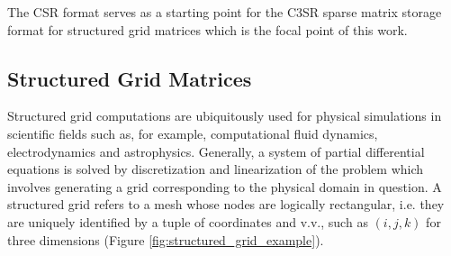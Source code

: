 \documentclass{article}
\begin{document}
    The CSR format serves as a starting point for the C3SR sparse matrix storage format for structured grid matrices which is the focal point of this work.

  \subsection{Structured Grid Matrices}

    Structured grid computations are ubiquitously used for physical simulations in scientific fields such as, for example, computational fluid dynamics, electrodynamics and astrophysics. Generally, a system of partial differential equations is solved by discretization and linearization of the problem which involves generating a grid corresponding to the physical domain in question. A structured grid refers to a mesh whose nodes are logically rectangular, i.e. they are uniquely identified by a tuple of coordinates and v.v., such as $(i, j, k)$ for three dimensions (Figure \ref{fig:structured_grid_example}).
\end{document}
